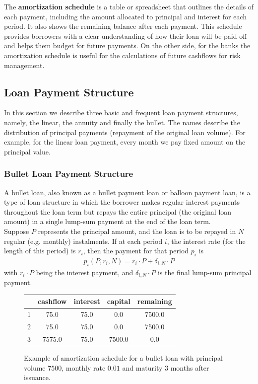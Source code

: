 \documentclass[11pt]{article}
\begin{document}
The \textbf{amortization schedule} is a table or spreadsheet that outlines the details of each payment, including the amount allocated to principal and interest for each period. It also shows the remaining balance after each payment. This schedule provides borrowers with a clear understanding of how their loan will be paid off and helps them budget for future payments. On the other side, for the banks the amortization schedule is useful for the calculations of future cashflows for risk management.

\subsection{Loan Payment Structure}

In this section we describe three basic and frequent loan payment structures, namely, the linear, the annuity and finally the bullet. The names describe the distribution of principal payments (repayment of the original loan volume). For example, for the linear loan payment, every month we pay fixed amount on the principal value. 


\subsubsection{Bullet Loan Payment Structure}

A bullet loan, also known as a bullet payment loan or balloon payment loan, is a type of loan structure in which the borrower makes regular interest payments throughout the loan term but repays the entire principal (the original loan amount) in a single lump-sum payment at the end of the loan term.\\

Suppose $P$ represents the principal amount, and the loan is to be repayed in $N$ regular (e.g. monthly) instalments. If at each period $i$, the interest rate (for the length of this period) is $r_i$, then the payment for that period $p_i$ is 
\begin{align}
	p_i(P,r_i,N) =r_i\cdot P+\delta_{i,N}\cdot P
	\label{bullet}
\end{align}
with $r_i\cdot P$ being the interest payment, and $\delta_{i,N}\cdot P$ is the final lump-sum principal payment.
\begin{figure}[ht!]
	\centering
	\begin{tabular}{|c|c|c|c|c|}
		\hline
		& cashflow & interest & capital & remaining\\
		\hline
		1 & 75.0 & 75.0 & 0.0 & 7500.0\\
		\hline
		2 & 75.0 & 75.0 & 0.0 & 7500.0\\
		\hline
		3 & 7575.0 & 75.0 & 7500.0 & 0.0\\
		\hline
	\end{tabular}
	\caption{Example of amortization schedule for a bullet loan with principal volume $7500$, monthly rate $0.01$ and maturity 3 months after issuance.}
\end{figure}
\end{document}
